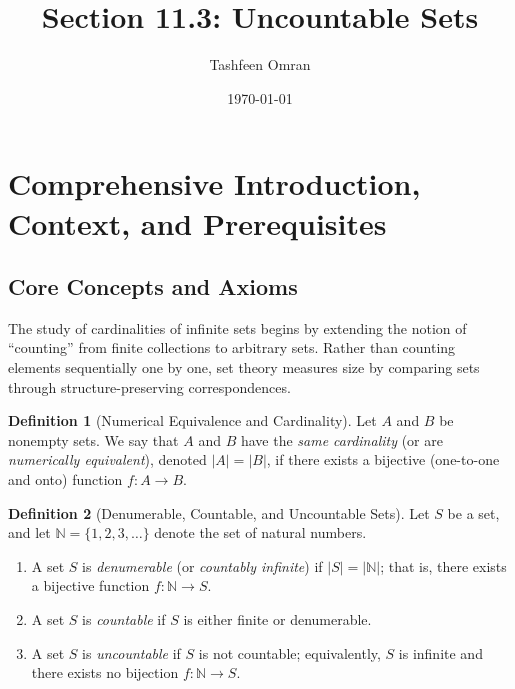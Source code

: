 \documentclass[11pt, letterpaper]{article}
\theoremstyle{definition}
\newtheorem{definition}{Definition}[section]
\theoremstyle{remark}
\begin{document}
\title{Section 11.3: Uncountable Sets}
\author{Tashfeen Omran}
\date{\today}

\maketitle
\tableofcontents
\newpage

\section{Comprehensive Introduction, Context, and Prerequisites}

\subsection{Core Concepts and Axioms}

The study of cardinalities of infinite sets begins by extending the notion of ``counting'' from finite collections to arbitrary sets. Rather than counting elements sequentially one by one, set theory measures size by comparing sets through structure-preserving correspondences.

\begin{definition}[Numerical Equivalence and Cardinality]
Let $A$ and $B$ be nonempty sets. We say that $A$ and $B$ have the \emph{same cardinality} (or are \emph{numerically equivalent}), denoted $|A| = |B|$, if there exists a bijective (one-to-one and onto) function $f : A \to B$.
\end{definition}

\begin{definition}[Denumerable, Countable, and Uncountable Sets]
Let $S$ be a set, and let $\mathbb{N} = \{1, 2, 3, \dots\}$ denote the set of natural numbers.
\begin{enumerate}[label=(\alph*)]
    \item A set $S$ is \emph{denumerable} (or \emph{countably infinite}) if $|S| = |\mathbb{N}|$; that is, there exists a bijective function $f : \mathbb{N} \to S$.
    \item A set $S$ is \emph{countable} if $S$ is either finite or denumerable.
    \item A set $S$ is \emph{uncountable} if $S$ is not countable; equivalently, $S$ is infinite and there exists no bijection $f : \mathbb{N} \to S$.
\end{enumerate}
\end{definition}
\end{document}
